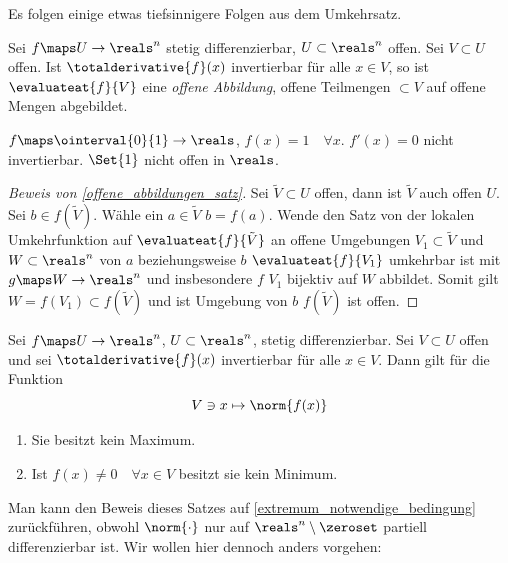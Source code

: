 Es folgen einige etwas tiefsinnigere Folgen aus dem Umkehrsatz.
\begin{satz}\label{offene_abbildungen_satz}
  Sei \( f\maps U\to \reals^n \) stetig differenzierbar, \( U\subset \reals^n \) offen. Sei \( V\subset U \) offen. Ist \( \totalderivative{f}(x) \) invertierbar für alle \( x\in V \), so ist \( \evaluateat{f}{V} \) eine \emph{offene Abbildung}, \dh offene Teilmengen \( \subset V \) auf offene Mengen abgebildet.
\end{satz}
\begin{antibeispiel*}
  \( f\maps \ointerval{0}{1}\to \reals \), \( f(x)=1\quad \forall x \). \( f'(x)=0 \) nicht invertierbar. \( \Set{1} \) nicht offen in \( \reals \).
\end{antibeispiel*}
\begin{proof}[Beweis von \ref{offene_abbildungen_satz}]
  Sei \( \tilde{V}\subset U \) offen, dann ist \( \tilde{V}  \) auch offen \( U \). Sei \( b\in f(\tilde{V}) \). Wähle ein \( a\in \tilde{V} \) \sd \( b=f(a) \). Wende den Satz von der lokalen Umkehrfunktion auf \( \evaluateat{f}{\tilde{V}} \) an \timplies \texists  offene Umgebungen \( V_1\subset \tilde{V} \) und \( W\subset \reals^n \) von \( a \) beziehungsweise \( b \) \sd \( \evaluateat{f}{V_1} \) umkehrbar ist mit \( g\maps W\to \reals^n \) und insbesondere \( f \) \( V_1 \) bijektiv auf \( W \) abbildet. Somit gilt \( W=f(V_1)\subset f(\tilde{V}) \) und ist Umgebung von \( b \) \timplies \( f(\tilde{V}) \) ist offen.
\end{proof}
\begin{satz}\label{extremumprinzip}
  Sei \( f\maps U\to \reals^n \), \( U\subset \reals^n \), stetig differenzierbar. Sei \( V\subset U \) offen und sei \( \totalderivative{f}(x) \) invertierbar für alle \( x\in V \). Dann gilt für die Funktion
  \begin{equation*}
    V\ni x\mapsto \norm{f(x)}
  \end{equation*}
  \begin{enumerate}
    \item \label{extremumprinzip:kein_maximum} Sie besitzt kein Maximum.
    \item \label{extremumprinzip:kein_minimum_wenn_nicht_null} Ist \( f(x)\neq 0\quad \forall x\in V \) besitzt sie kein Minimum.
  \end{enumerate}
\end{satz}
\begin{beachte*}
  Man kann den Beweis dieses Satzes auf \ref{extremum_notwendige_bedingung} zurückführen, obwohl \( \norm{\cdot} \) nur auf \( \reals^n\setminus \zeroset  \) partiell differenzierbar ist. Wir wollen hier dennoch anders vorgehen:
\end{beachte*}

